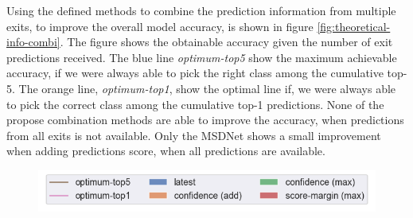 Using the defined methods to combine the prediction information from multiple exits, to improve the overall model accuracy, is shown in figure \ref{fig:theoretical-info-combi}. The figure shows the obtainable accuracy given the number of exit predictions received. The blue line \textit{optimum-top5} show the maximum achievable accuracy, if we were always able to pick the right class among the cumulative top-5. The orange line, \textit{optimum-top1}, show the optimal line if, we were always able to pick the correct class among the cumulative top-1 predictions. None of the propose combination methods are able to improve the accuracy, when predictions from all exits is not available. Only the MSDNet shows a small improvement when adding predictions score, when all predictions are available.

\begin{figure}
	\captionsetup[subfigure]{justification=centering,farskip=1pt,captionskip=1pt}
	\centering
	\includegraphics[width=.7\linewidth, keepaspectratio]{figures/edge/theoretical_score_combination_legend}
	\hfill

\end{figure}
